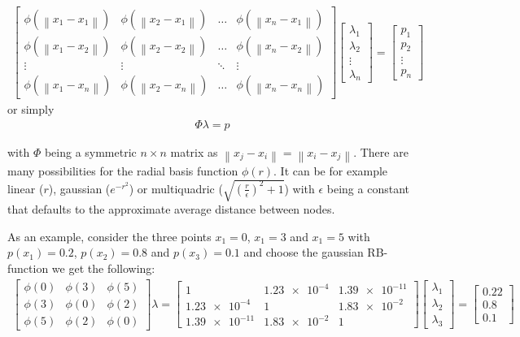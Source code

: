 \begin{align}
	\begin{bmatrix}
		\phi(\left\|x_1-x_1\right\|) & \phi(\left\|x_2-x_1\right\|) & \dots  & \phi(\left\|x_n-x_1\right\|) \\
		\phi(\left\|x_1-x_2\right\|) & \phi(\left\|x_2-x_2\right\|) & \dots  & \phi(\left\|x_n-x_2\right\|) \\
		\vdots                       & \vdots                       & \ddots & \vdots                       \\
		\phi(\left\|x_1-x_n\right\|) & \phi(\left\|x_2-x_n\right\|) & \dots  & \phi(\left\|x_n-x_n\right\|)
	\end{bmatrix} 
	\begin{bmatrix}
		\lambda_1 \\
		\lambda_2 \\
		\vdots    \\
		\lambda_n
	\end{bmatrix}
	=
	\begin{bmatrix}
		p_1    \\
		p_2    \\
		\vdots \\
		p_n
	\end{bmatrix}
\end{align}
or simply
\begin{align}
	\Phi\lambda=p
\end{align}

with $\Phi$ being a symmetric $n \times n $ matrix as $\left\|x_j-x_i\right\|=\left\|x_i-x_j\right\|$. There are many possibilities for the radial basis function $\phi(r)$. It can be for example linear ($r$), gaussian ($e^{-r^2}$) or multiquadric ($\sqrt{\left(\frac{r}{\epsilon}\right)^2 + 1}$) with $\epsilon$ being a constant that defaults to the approximate average distance between nodes.

As an example, consider the three points $x_1=0$, $x_1=3$ and $x_1=5$ with $p(x_1)=0.2$, $p(x_2)=0.8$ and $p(x_3)=0.1$ and choose the gaussian RB-function we get the following:
\begin{align}
	\begin{bmatrix}
		\phi(0) & \phi(3)  & \phi(5) \\
		\phi(3) & \phi(0) & \phi(2) \\
		\phi(5) & \phi(2)  & \phi(0)
	\end{bmatrix} 
	\lambda
	=
		\begin{bmatrix}
			1              & \num{1.23e-4} & \num{1.39e-11} \\
			\num{1.23e-4}  & 1             & \num{1.83e-2}  \\
			\num{1.39e-11} & \num{1.83e-2} & 1
		\end{bmatrix} 
	\begin{bmatrix}
\lambda_1 \\
\lambda_2 \\
\lambda_3
\end{bmatrix}
=
\begin{bmatrix}
0.22\\0.8\\0.1
\end{bmatrix}
\end{align}


